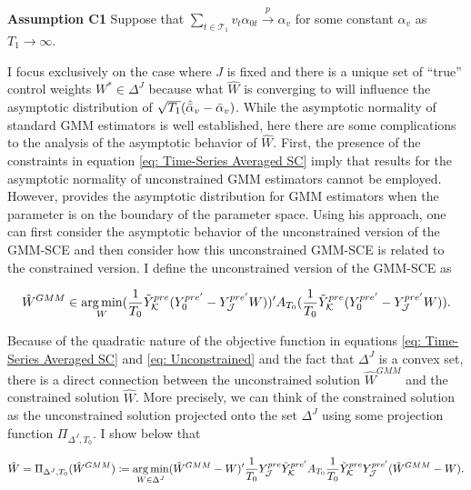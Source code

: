 \documentclass{article}
\DeclareMathOperator*{\argmin}{arg\,min}
\begin{document}
\textbf{Assumption C1}\label{AC1} Suppose that $\sum_{t \in \mathcal{T}_1} v_t \alpha_{0t} \overset{p}{\rightarrow} \alpha_v$ for some constant $\alpha_v$ as $T_1 \rightarrow \infty$.

I focus exclusively on the case where $J$ is fixed and there is a unique set of “true” control weights $W^* \in \Delta^J$ because what $\hat{W}$ is converging to will influence the asymptotic distribution of $\sqrt{T_1}(\hat{\Bar{\alpha}}_v - \Bar{\alpha}_v)$. While the asymptotic normality of standard GMM estimators is well established, here there are some complications to the analysis of the asymptotic behavior of $\hat{W}$. First, the presence of the constraints in equation \eqref{eq: Time-Series Averaged SC} imply that results for the asymptotic normality of unconstrained GMM estimators cannot be employed. However, \cite{Andrews2002} provides the asymptotic distribution for GMM estimators when the parameter is on the boundary of the parameter space. Using his approach, one can first consider the asymptotic behavior of the unconstrained version of the GMM-SCE and then consider how this unconstrained GMM-SCE is related to the constrained version. I define the unconstrained version of the GMM-SCE as 

\begin{equation} \label{eq: Unconstrained}
    \hat{W}^{GMM} \in \argmin_{W} (\frac{1}{T_0} \Tilde{Y}_{\mathcal{K}}^{pre}
     (Y_{0}^{pre'} - Y_{\mathcal{J}}^{pre'} W))'A_{T_0} (\frac{1}{T_0} \Tilde{Y}_{\mathcal{K}}^{pre}(Y_{0}^{pre'} - Y_{\mathcal{J}}^{pre'} W)).
\end{equation}

Because of the quadratic nature of the objective function in equations \eqref{eq: Time-Series Averaged SC} and \eqref{eq: Unconstrained} and the fact that $\Delta^J$ is a convex set, there is a direct connection between the unconstrained solution $\hat{W}^{GMM}$ and the constrained solution $\hat{W}$. More precisely, we can think of the constrained solution as the unconstrained solution projected onto the set $\Delta^J$ using some projection function $\Pi_{\Delta^J,T_0}$. I show below that 

\begin{equation} \label{eq: Projection}
    \hat{W} = \Pi_{\Delta^J,T_0 } (\hat{W}^{GMM}) \coloneqq \argmin_{W \in \Delta^J} (\hat{W}^{GMM} - W)' \frac{1}{T_0} Y_{\mathcal{J}}^{pre} \Tilde{Y}_{\mathcal{K}}^{pre'} A_{T_0} \frac{1}{T_0}\Tilde{Y}_{\mathcal{K}}^{pre} Y_{\mathcal{J}}^{pre'} (\hat{W}^{GMM} - W).
\end{equation}
\end{document}
